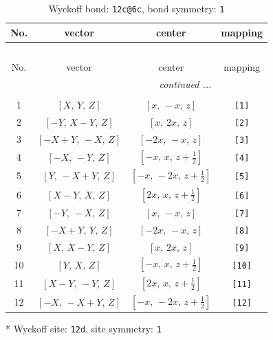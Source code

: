 \documentclass[fleqn,8pt]{jsarticle}
\begin{document}
\begin{longtable}{cccc}
\caption{Wyckoff bond: {\tt 12c@6c}, bond symmetry: {\tt 1}}
 \\
 \hline \hline
No. & vector & center & mapping \\ \hline \endfirsthead

\multicolumn{3}{l}{\tablename\ \thetable{}} \\
 \hline \hline
No. & vector & center & mapping \\ \hline \endhead

 \hline \hline
\multicolumn{3}{r}{\footnotesize\it continued ...} \\ \endfoot

 \hline \hline
\multicolumn{3}{r}{} \\ \endlastfoot

1 & $\left[ X,\, Y,\, Z \right]$ & $\left[ x,\, - x,\, z \right]$ & {\tt [1]} \\ \hline
2 & $\left[ - Y,\, X - Y,\, Z \right]$ & $\left[ x,\, 2 x,\, z \right]$ & {\tt [2]} \\ \hline
3 & $\left[ - X + Y,\, - X,\, Z \right]$ & $\left[ - 2 x,\, - x,\, z \right]$ & {\tt [3]} \\ \hline
4 & $\left[ - X,\, - Y,\, Z \right]$ & $\left[ - x,\, x,\, z + \frac{1}{2} \right]$ & {\tt [4]} \\ \hline
5 & $\left[ Y,\, - X + Y,\, Z \right]$ & $\left[ - x,\, - 2 x,\, z + \frac{1}{2} \right]$ & {\tt [5]} \\ \hline
6 & $\left[ X - Y,\, X,\, Z \right]$ & $\left[ 2 x,\, x,\, z + \frac{1}{2} \right]$ & {\tt [6]} \\ \hline
7 & $\left[ - Y,\, - X,\, Z \right]$ & $\left[ x,\, - x,\, z \right]$ & {\tt [7]} \\ \hline
8 & $\left[ - X + Y,\, Y,\, Z \right]$ & $\left[ - 2 x,\, - x,\, z \right]$ & {\tt [8]} \\ \hline
9 & $\left[ X,\, X - Y,\, Z \right]$ & $\left[ x,\, 2 x,\, z \right]$ & {\tt [9]} \\ \hline
10 & $\left[ Y,\, X,\, Z \right]$ & $\left[ - x,\, x,\, z + \frac{1}{2} \right]$ & {\tt [10]} \\ \hline
11 & $\left[ X - Y,\, - Y,\, Z \right]$ & $\left[ 2 x,\, x,\, z + \frac{1}{2} \right]$ & {\tt [11]} \\ \hline
12 & $\left[ - X,\, - X + Y,\, Z \right]$ & $\left[ - x,\, - 2 x,\, z + \frac{1}{2} \right]$ & {\tt [12]} \\
\end{longtable}
* Wyckoff site: {\tt 12d}, site symmetry: {\tt 1}
\end{document}
